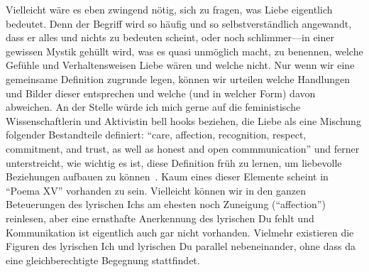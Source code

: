 Vielleicht wäre es eben zwingend nötig, sich zu fragen, was Liebe eigentlich bedeutet.
Denn der Begriff wird so häufig und so selbstverständlich angewandt, dass er alles und nichts zu bedeuten scheint, oder noch schlimmer—in einer gewissen Mystik gehüllt wird, was es quasi unmöglich macht, zu benennen, welche Gefühle und Verhaltensweisen Liebe wären und welche nicht.
Nur wenn wir eine gemeinsame Definition zugrunde legen, können wir urteilen welche Handlungen und Bilder dieser entsprechen und welche (und in welcher Form) davon abweichen.
An der Stelle würde ich mich gerne auf die feministische Wissenschaftlerin und Aktivistin bell hooks beziehen, die Liebe als eine Mischung folgender Bestandteile definiert: ``care, affection, recognition, respect, commitment, and trust, as well as honest and open commmunication''
und ferner unterstreicht, wie wichtig es ist, diese Definition früh zu lernen, um liebevolle Beziehungen aufbauen zu können~\cite{hooks2001}.
Kaum eines dieser Elemente scheint in ``Poema XV'' vorhanden zu sein.
Vielleicht können wir in den ganzen Beteuerungen des lyrischen Ichs am ehesten noch Zuneigung (``affection'') reinlesen, aber eine ernsthafte Anerkennung des lyrischen Du fehlt und Kommunikation ist eigentlich auch gar nicht vorhanden.
Vielmehr existieren die Figuren des lyrischen Ich und lyrischen Du parallel nebeneinander, ohne dass da eine gleichberechtigte Begegnung stattfindet.

